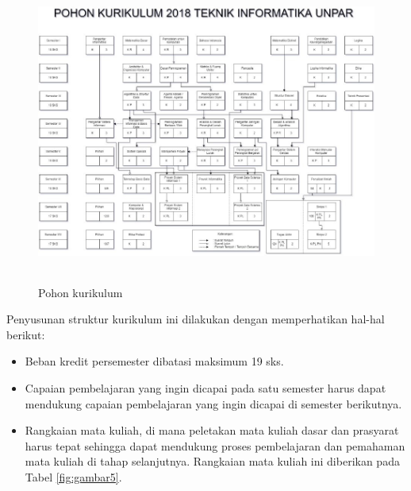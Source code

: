 \begin{figure}[H]
    \centering
    \includegraphics[width=14cm, height=10cm]{Gambar/Pohon Kurikulum .jpg}
    \caption{Pohon kurikulum}
    \label{fig:gambar4}
\end{figure}

Penyusunan struktur kurikulum ini dilakukan dengan memperhatikan hal-hal berikut:

\begin{itemize}
    \item Beban kredit persemester dibatasi maksimum 19 sks.
    \item Capaian pembelajaran yang ingin dicapai pada satu semester harus dapat mendukung capaian pembelajaran yang ingin dicapai di semester berikutnya.
    \item Rangkaian mata kuliah, di mana peletakan mata kuliah dasar dan prasyarat harus tepat sehingga dapat mendukung proses pembelajaran dan pemahaman mata kuliah di tahap selanjutnya. Rangkaian mata kuliah ini diberikan pada Tabel \ref{fig:gambar5}.
\end{itemize}


